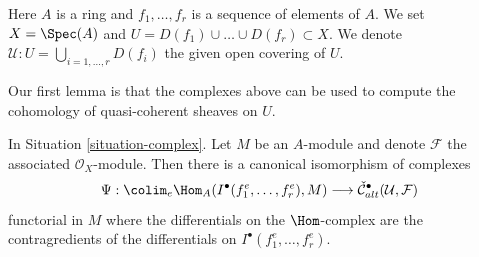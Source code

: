 \begin{situation}
\label{situation-complex}
Here $A$ is a ring and $f_1, \ldots, f_r$ is a sequence of elements of $A$.
We set $X = \Spec(A)$ and $U = D(f_1) \cup \ldots \cup D(f_r) \subset X$.
We denote $\mathcal{U} : U = \bigcup_{i = 1, \ldots, r} D(f_i)$ the
given open covering of $U$.
\end{situation}

\noindent
Our first lemma is that the complexes above can be used to compute
the cohomology of quasi-coherent sheaves on $U$.

\begin{lemma}
\label{lemma-alternating-cech-complex}
In Situation \ref{situation-complex}. Let $M$ be an $A$-module and
denote $\mathcal{F}$ the associated $\mathcal{O}_X$-module. Then
there is a canonical isomorphism of complexes
$$
\Psi : \colim_e \Hom_A(I^\bullet(f_1^e, \ldots, f_r^e), M)
\longrightarrow
\check{\mathcal{C}}_{alt}^\bullet(\mathcal{U}, \mathcal{F})
$$
functorial in $M$ where the differentials on the $\Hom$-complex
are the contragredients of the differentials on
$I^\bullet(f_1^e, \ldots, f_r^e)$.
\end{lemma}

